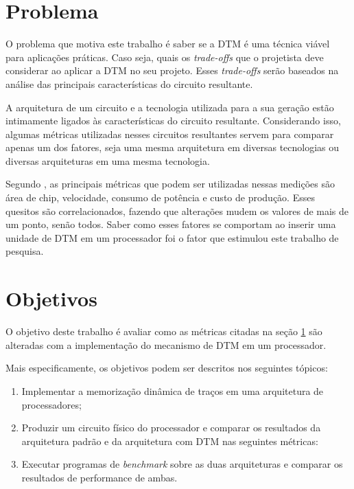 \section{Problema}
\label{Introducao:Problema}

O problema que motiva este trabalho é saber se a DTM é uma técnica viável para aplicações práticas. Caso seja, quais os \textit{trade-offs} que o projetista deve considerar ao aplicar a DTM no seu projeto. Esses \textit{trade-offs} serão baseados na análise das principais características do circuito resultante.

A arquitetura de um circuito e a tecnologia utilizada para a sua geração estão intimamente ligados às características do circuito resultante. Considerando isso, algumas métricas utilizadas nesses circuitos resultantes servem para comparar apenas um dos fatores, seja uma mesma arquitetura em diversas tecnologias ou diversas arquiteturas em uma mesma tecnologia.

Segundo , as principais métricas que podem ser utilizadas nessas medições são área de chip, velocidade, consumo de potência e custo de produção. Esses quesitos são correlacionados, fazendo que alterações mudem os valores de mais de um ponto, senão todos. Saber como esses fatores se comportam ao inserir uma unidade de DTM em um processador foi o fator que estimulou este trabalho de pesquisa.

\section{Objetivos}
\label{Introducao:Objetivos} %

O objetivo deste trabalho é avaliar como as métricas citadas na seção \ref{Introducao:Problema} são alteradas com a implementação do mecanismo de DTM em um processador.

Mais especificamente, os objetivos podem ser descritos nos seguintes tópicos:
\begin{enumerate}
	\item Implementar a memorização dinâmica de traços em uma arquitetura de processadores;
	\item Produzir um circuito físico do processador e comparar os resultados da arquitetura padrão e da arquitetura com DTM nas seguintes métricas:
	
	
	\item Executar programas de \textit{benchmark} sobre as duas arquiteturas e comparar os resultados de performance de ambas.
\end{enumerate}

